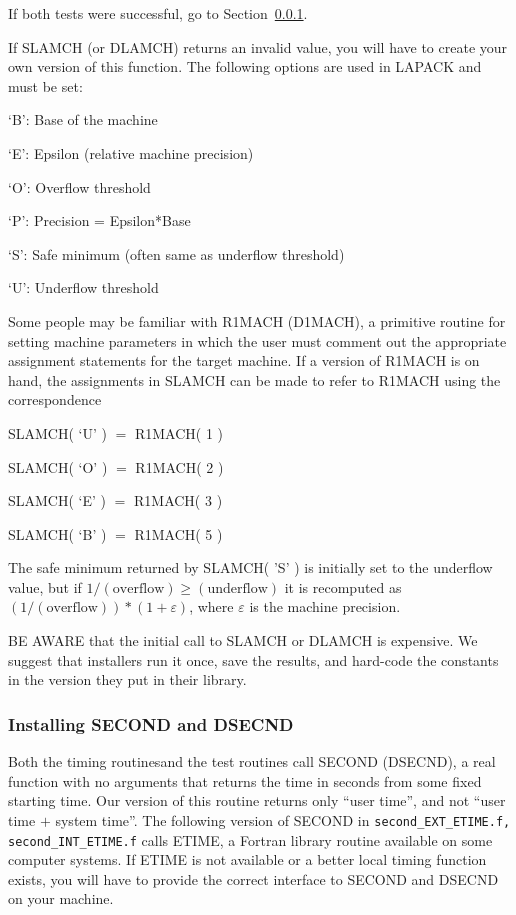 \documentclass[11pt]{report}
\begin{document}
If both tests were successful, go to Section~\ref{second}.

If SLAMCH (or DLAMCH) returns an invalid value, you will have to create
your own version of this function.  The following options are used in
LAPACK and must be set:

\begin{list}{}{}
\item {`B': }  Base of the machine
\item {`E': }  Epsilon (relative machine precision)
\item {`O': }  Overflow threshold
\item {`P': }  Precision = Epsilon*Base
\item {`S': }  Safe minimum (often same as underflow threshold)
\item {`U': }  Underflow threshold
\end{list}

Some people may be familiar with R1MACH (D1MACH), a primitive
routine for setting machine parameters in which the user must
comment out the appropriate assignment statements for the target
machine.  If a version of R1MACH is on hand, the assignments in
SLAMCH can be made to refer to R1MACH using the correspondence

\begin{list}{}{}
\item {SLAMCH( `U' )}  $=$ R1MACH( 1 )
\item {SLAMCH( `O' )}  $=$ R1MACH( 2 )
\item {SLAMCH( `E' )}  $=$ R1MACH( 3 )
\item {SLAMCH( `B' )}  $=$ R1MACH( 5 )
\end{list}

\noindent
The safe minimum returned by SLAMCH( 'S' ) is initially set to the
underflow value, but if $1/(\mathrm{overflow}) \geq (\mathrm{underflow})$
it is recomputed as $(1/(\mathrm{overflow})) * ( 1 + \varepsilon )$,
where $\varepsilon$ is the machine precision.

BE AWARE that the initial call to SLAMCH or DLAMCH is expensive.
We suggest that installers run it once, save the results, and hard-code
the constants in the version they put in their library.

\subsubsection{Installing SECOND and DSECND}\label{second}

Both the timing routines\footnotemark[\value{footnote}]  and the test routines call SECOND
(DSECND), a real function with no arguments that returns the time
in seconds from some fixed starting time.
Our version of this routine
returns only ``user time'', and not ``user time $+$ system time''.
The following version of SECOND in \texttt{second\_EXT\_ETIME.f, second\_INT\_ETIME.f} calls
ETIME, a Fortran library routine available on some computer systems.
If ETIME is not available or a better local timing function exists,
you will have to provide the correct interface to SECOND and DSECND
on your machine.
\end{document}
